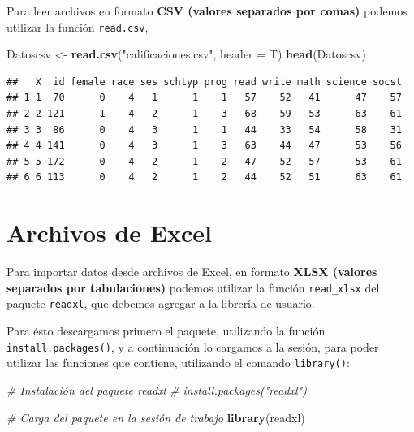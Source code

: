 \documentclass[
]{book}
\newenvironment{Shaded}{\begin{snugshade}}{\end{snugshade}}
\newcommand{\AttributeTok}[1]{\textcolor[rgb]{0.13,0.29,0.53}{#1}}
\newcommand{\CommentTok}[1]{\textcolor[rgb]{0.56,0.35,0.01}{\textit{#1}}}
\newcommand{\FunctionTok}[1]{\textcolor[rgb]{0.13,0.29,0.53}{\textbf{#1}}}
\newcommand{\NormalTok}[1]{#1}
\newcommand{\OtherTok}[1]{\textcolor[rgb]{0.56,0.35,0.01}{#1}}
\newcommand{\StringTok}[1]{\textcolor[rgb]{0.31,0.60,0.02}{#1}}
\begin{document}
Para leer archivos en formato \textbf{CSV (valores separados por comas)} podemos utilizar la función \texttt{read.csv},

\begin{Shaded}
\begin{Highlighting}[]
\NormalTok{Datoscsv }\OtherTok{\textless{}{-}} \FunctionTok{read.csv}\NormalTok{(}\StringTok{"calificaciones.csv"}\NormalTok{, }\AttributeTok{header =}\NormalTok{ T)}
\FunctionTok{head}\NormalTok{(Datoscsv)}
\end{Highlighting}
\end{Shaded}

\begin{verbatim}
##   X  id female race ses schtyp prog read write math science socst
## 1 1  70      0    4   1      1    1   57    52   41      47    57
## 2 2 121      1    4   2      1    3   68    59   53      63    61
## 3 3  86      0    4   3      1    1   44    33   54      58    31
## 4 4 141      0    4   3      1    3   63    44   47      53    56
## 5 5 172      0    4   2      1    2   47    52   57      53    61
## 6 6 113      0    4   2      1    2   44    52   51      63    61
\end{verbatim}

\hypertarget{archivos-de-excel}{%
\section{Archivos de Excel}\label{archivos-de-excel}}

Para importar datos desde archivos de Excel, en formato \textbf{XLSX (valores separados por tabulaciones)} podemos utilizar la función \texttt{read\_xlsx} del paquete \texttt{readxl}, que debemos agregar a la librería de usuario.

Para ésto descargamos primero el paquete, utilizando la función \texttt{install.packages()}, y a continuación lo cargamos a la sesión, para poder utilizar las funciones que contiene, utilizando el comando \texttt{library()}:

\begin{Shaded}
\begin{Highlighting}[]
\CommentTok{\# Instalación del paquete readxl}
\CommentTok{\# install.packages("readxl")}

\CommentTok{\# Carga del paquete en la sesión de trabajo}
\FunctionTok{library}\NormalTok{(readxl)}
\end{Highlighting}
\end{Shaded}
\end{document}
